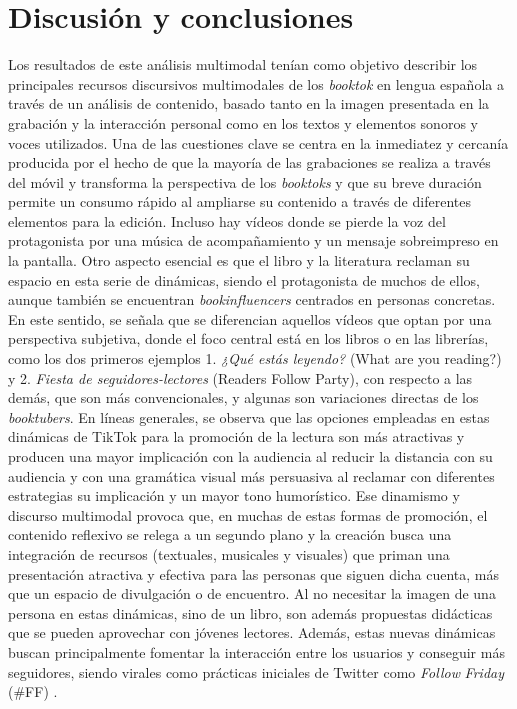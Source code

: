 \section{Discusión y conclusiones}\label{sec-discussion}

Los resultados de este análisis multimodal tenían como objetivo
describir los principales recursos discursivos multimodales de los
\emph{booktok} en lengua española a través de un análisis de contenido,
basado tanto en la imagen presentada en la grabación y la interacción
personal como en los textos y elementos sonoros y voces utilizados. Una
de las cuestiones clave se centra en la inmediatez y cercanía producida
por el hecho de que la mayoría de las grabaciones se realiza a través
del móvil y transforma la perspectiva de los \emph{booktoks} y que su
breve duración permite un consumo rápido al ampliarse su contenido a
través de diferentes elementos para la edición. Incluso hay vídeos donde
se pierde la voz del protagonista por una música de acompañamiento y un
mensaje sobreimpreso en la pantalla. Otro aspecto esencial es que el
libro y la literatura reclaman su espacio en esta serie de dinámicas,
siendo el protagonista de muchos de ellos, aunque también se encuentran
\emph{bookinfluencers} centrados en personas concretas. En este sentido,
se señala que se diferencian aquellos vídeos que optan por una
perspectiva subjetiva, donde el foco central está en los libros o en las
librerías, como los dos primeros ejemplos 1. \emph{¿Qué estás leyendo?}
(What are you reading?) y 2. \emph{Fiesta de seguidores-lectores}
(Readers Follow Party), con respecto a las demás, que son más
convencionales, y algunas son variaciones directas de los
\emph{booktubers}. En líneas generales, se observa que las opciones
empleadas en estas dinámicas de TikTok para la promoción de la lectura
son más atractivas y producen una mayor implicación con la audiencia al
reducir la distancia con su audiencia y con una gramática visual \cite{kress2006} más persuasiva al reclamar con diferentes estrategias
su implicación y un mayor tono humorístico. Ese dinamismo y discurso
multimodal provoca que, en muchas de estas formas de promoción, el
contenido reflexivo se relega a un segundo plano y la creación busca una
integración de recursos (textuales, musicales y visuales) que priman una
presentación atractiva y efectiva para las personas que siguen dicha
cuenta, más que un espacio de divulgación o de encuentro. Al no
necesitar la imagen de una persona en estas dinámicas, sino de un libro,
son además propuestas didácticas que se pueden aprovechar con jóvenes
lectores. Además, estas nuevas dinámicas buscan principalmente fomentar
la interacción entre los usuarios y conseguir más seguidores, siendo
virales como prácticas iniciales de Twitter como \emph{Follow}
\emph{Friday} (\#FF) \cite{cui2012}.

